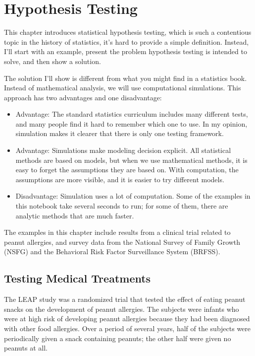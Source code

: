 \chapter{Hypothesis Testing}\label{hypothesis-testing}

This chapter introduces statistical hypothesis testing, which is such a
contentious topic in the history of statistics, it's hard to provide a
simple definition. Instead, I'll start with an example, present the
problem hypothesis testing is intended to solve, and then show a
solution.

The solution I'll show is different from what you might find in a
statistics book. Instead of mathematical analysis, we will use
computational simulations. This approach has two advantages and one
disadvantage:

\begin{itemize}
\item
  Advantage: The standard statistics curriculum includes many different
  tests, and many people find it hard to remember which one to use. In
  my opinion, simulation makes it clearer that there is only one testing
  framework.
\item
  Advantage: Simulations make modeling decision explicit. All
  statistical methods are based on models, but when we use mathematical
  methods, it is easy to forget the assumptions they are based on. With
  computation, the assumptions are more visible, and it is easier to try
  different models.
\item
  Disadvantage: Simulation uses a lot of computation. Some of the
  examples in this notebook take several seconds to run; for some of
  them, there are analytic methods that are much faster.
\end{itemize}

The examples in this chapter include results from a clinical trial
related to peanut allergies, and survey data from the National Survey of
Family Growth (NSFG) and the Behavioral Risk Factor Surveillance System
(BRFSS).

\section{Testing Medical Treatments}\label{testing-medical-treatments}

The LEAP study was a randomized trial that tested the effect of eating
peanut snacks on the development of peanut allergies. The subjects were
infants who were at high risk of developing peanut allergies because
they had been diagnosed with other food allergies. Over a period of
several years, half of the subjects were periodically given a snack
containing peanuts; the other half were given no peanuts at all.

